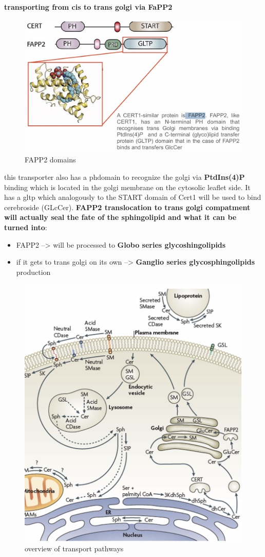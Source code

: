 \documentclass[../main.tex]{subfiles}
\begin{document}
\paragraph{transporting from cis to trans golgi via FaPP2}
\begin{figure}[H]
    \centering
    \includegraphics[width=0.5\linewidth]{FAPP2.png}
    \caption{FAPP2 domains}
    \label{fig:enter-label}
\end{figure}
this transporter also has a \gls{phdomain} to recognize the golgi via \textbf{PtdIns(4)P } binding which is located in the golgi membrane on the cytosolic leaflet side. It has a \gls{gltp} which analogously to the START domain of Cert1 will be used to bind cerebroside (GLcCer). \textbf{FAPP2 translocation to trans golgi compatment will actually seal the fate of the sphingolipid and what it can be turned into}: 
\begin{itemize}
    \item FAPP2 --> will be processed to \textbf{Globo series glycoshingolipids}
    \item if it gets to trans golgi on its own --> \textbf{Ganglio series glycosphingolipids} production
\end{itemize}
\begin{figure}[H]
    \centering
    \includegraphics[width=0.4\linewidth]{transport.png}
    \caption{overview of transport pathways}
    \label{fig:enter-label}
\end{figure}
\end{document}
